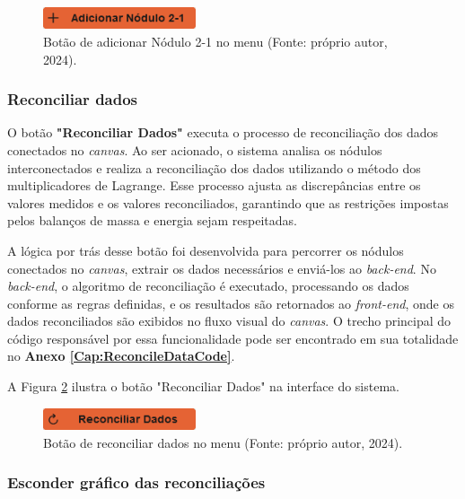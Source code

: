 \begin{figure}[htbp]
    \centering
    \includegraphics[width=0.4\textwidth]{figuras/add-node21-button.png}
    \caption{Botão de adicionar Nódulo 2-1 no menu (Fonte: próprio autor, 2024).}
    \label{Fig:AddNodeTwoOneButton}
\end{figure}

\subsubsection{Reconciliar dados}

O botão \textbf{"Reconciliar Dados"} executa o processo de reconciliação dos dados conectados no \textit{canvas}. Ao ser acionado, o sistema analisa os nódulos interconectados e realiza a reconciliação dos dados utilizando o método dos multiplicadores de Lagrange. Esse processo ajusta as discrepâncias entre os valores medidos e os valores reconciliados, garantindo que as restrições impostas pelos balanços de massa e energia sejam respeitadas.

A lógica por trás desse botão foi desenvolvida para percorrer os nódulos conectados no \textit{canvas}, extrair os dados necessários e enviá-los ao \textit{back-end}. No \textit{back-end}, o algoritmo de reconciliação é executado, processando os dados conforme as regras definidas, e os resultados são retornados ao \textit{front-end}, onde os dados reconciliados são exibidos no fluxo visual do \textit{canvas}. O trecho principal do código responsável por essa funcionalidade pode ser encontrado em sua totalidade no \textbf{Anexo \ref{Cap:ReconcileDataCode}}.

A Figura \ref{Fig:ReconcileButton} ilustra o botão "Reconciliar Dados" na interface do sistema.

\begin{figure}[htbp]
    \centering
    \includegraphics[width=0.4\textwidth]{figuras/reconcile-data-button.png}
    \caption{Botão de reconciliar dados no menu (Fonte: próprio autor, 2024).}
    \label{Fig:ReconcileButton}
\end{figure}

\subsubsection{Esconder gráfico das reconciliações}

